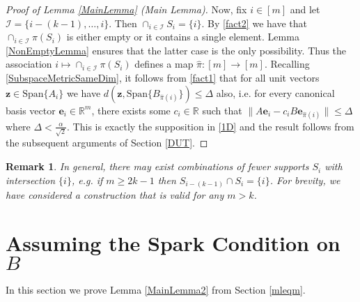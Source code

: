 \documentclass[journal, onecolumn]{IEEEtran}
\newtheorem{remark}{Remark}
\begin{document}
\begin{proof}[Proof of Lemma \ref{MainLemma} (Main Lemma)]
Now, fix $i \in [m]$ and let $\mathcal{I} = \{i-(k-1), \ldots, i\}$. Then $\cap_{i \in \mathcal{I}} S_i = \{i\}$. By \eqref{fact2} we have that $\cap_{i \in \mathcal{I}} \pi(S_i)$ is either empty or it contains a single element. Lemma \ref{NonEmptyLemma} ensures that the latter case is the only possibility. Thus the association $i \mapsto \cap_{i \in \mathcal{I}} \pi(S_i)$ defines a map $\hat \pi: [m] \to [m]$. Recalling \eqref{SubspaceMetricSameDim}, it follows from \eqref{fact1} that for all unit vectors $\mathbf{z} \in \text{Span}\{A_{i}\}$ we have $d\left( \mathbf{z}, \text{Span}\{B_{\hat \pi(i)}\}\right) \leq \Delta$ also, i.e. for every canonical basis vector $\mathbf{e}_i \in \mathbb{R}^m$, there exists some $c_i \in \mathbb{R}$ such that $\|A\mathbf{e}_i - c_iB\mathbf{e}_{\hat \pi(i)}\| \leq \Delta$ where $\Delta < \frac{\alpha}{\sqrt{2}}$. This is exactly the supposition in \eqref{1D} and the result follows from the subsequent arguments of Section \ref{DUT}. 
\end{proof}

\begin{remark} In general, there may exist combinations of fewer supports $S_i$ with intersection $\{i\}$, e.g. if $m \geq 2k-1$ then $S_{i - (k-1)} \cap S_i = \{i\}$. For brevity, we have considered a construction that is valid for any $m > k$.
\end{remark}


\section{Assuming the Spark Condition on $B$}\label{mleqmAppendix}

In this section we prove Lemma \ref{MainLemma2} from Section \ref{mleqm}.

\end{document}
